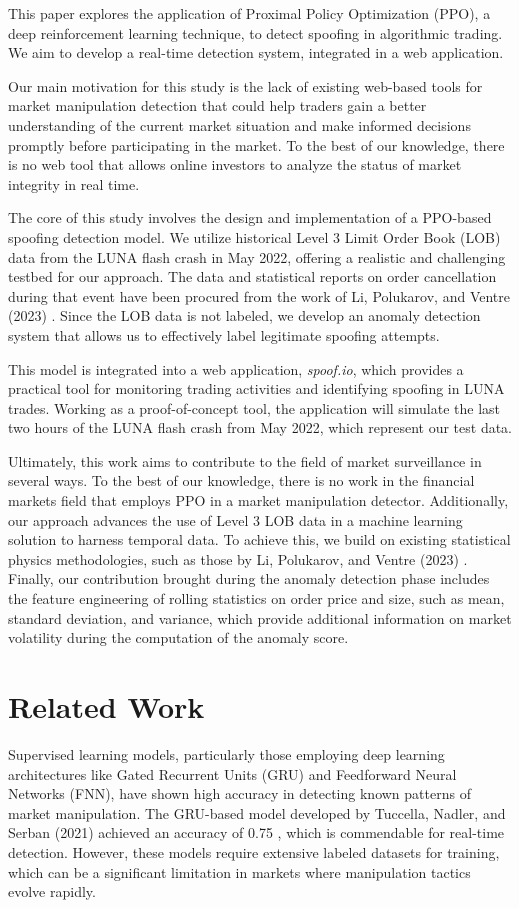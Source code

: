 \documentclass[conference]{IEEEtran}
\begin{document}
This paper explores the application of Proximal Policy Optimization (PPO), a deep reinforcement learning technique, to detect spoofing in algorithmic trading. We aim to develop a real-time detection system, integrated in a web application.

Our main motivation for this study is the lack of existing web-based tools for market manipulation detection that could help traders gain a better understanding of the current market situation and make informed decisions promptly before participating in the market. To the best of our knowledge, there is no web tool that allows online investors to analyze the status of market integrity in real time.

The core of this study involves the design and implementation of a PPO-based spoofing detection model. We utilize historical Level 3 Limit Order Book (LOB) data from the LUNA flash crash in May 2022, offering a realistic and challenging testbed for our approach. The data and statistical reports on order cancellation during that event have been procured from the work of Li, Polukarov, and Ventre (2023) \cite{Li_2023}. Since the LOB data is not labeled, we develop an anomaly detection system that allows us to effectively label legitimate spoofing attempts.

This model is integrated into a web application, \textit{spoof.io}, which provides a practical tool for monitoring trading activities and identifying spoofing in LUNA trades. Working as a proof-of-concept tool, the application will simulate the last two hours of the LUNA flash crash from May 2022, which represent our test data.

Ultimately, this work aims to contribute to the field of market surveillance in several ways. To the best of our knowledge, there is no work in the financial markets field that employs PPO in a market manipulation detector. Additionally, our approach advances the use of Level 3 LOB data in a machine learning solution to harness temporal data. To achieve this, we build on existing statistical physics methodologies, such as those by Li, Polukarov, and Ventre (2023) \cite{Li_2023}. Finally, our contribution brought during the anomaly detection phase includes the feature engineering of rolling statistics on order price and size, such as mean, standard deviation, and variance, which provide additional information on market volatility during the computation of the anomaly score.

\section{Related Work}
\par Supervised learning models, particularly those employing deep learning architectures like Gated Recurrent Units (GRU) and Feedforward Neural Networks (FNN), have shown high accuracy in detecting known patterns of market manipulation. The GRU-based model developed by Tuccella, Nadler, and Serban (2021) achieved an accuracy of 0.75 \cite{Tuc_2021}, which is commendable for real-time detection. However, these models require extensive labeled datasets for training, which can be a significant limitation in markets where manipulation tactics evolve rapidly.
\end{document}

